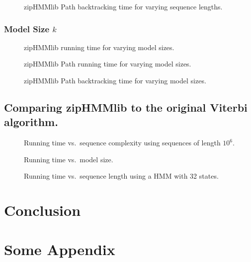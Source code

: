\documentclass[oneside,a4,danish,english,report]{memoir}
\begin{document}
\begin{figure}[H]
  \centering
  
  \caption{zipHMMlib Path backtracking time for varying sequence lengths.}
  \label{fig:assymptotic_viterbi_backtrack_n}
\end{figure}

\subsection{Model Size $k$}
\label{sec:model-size-k}

\begin{figure}[H]
  \centering
  
  \caption{zipHMMlib running time for varying model sizes.}
  \label{fig:assymptotic_viterbi_k}
\end{figure}

\begin{figure}[H]
  \centering
  
  \caption{zipHMMlib Path running time for varying model sizes.}
  \label{fig:assymptotic_viterbi_path_k}
\end{figure}

\begin{figure}[H]
  \centering
  
  \caption{zipHMMlib Path backtracking time for varying model sizes.}
  \label{fig:assymptotic_viterbi_backtrack_k}
\end{figure}

\section{Comparing zipHMMlib to the original Viterbi algorithm.}
\label{sec:comp-ziphmml-orig}

\begin{figure}[H]
  \centering
  
  \caption{Running time vs.\ sequence complexity using sequences of length $10^6$.}
  \label{fig:speedup_vs_complexity}
\end{figure}

\begin{figure}[H]
  \centering
  
  \caption{Running time vs.\ model size.}
  \label{fig:speedup_vs_k}
\end{figure}

\begin{figure}[H]
  \centering
  
  \caption{Running time vs.\ sequence length using a HMM with 32 states.}
  \label{fig:speedup_vs_sequence_length}
\end{figure}

\chapter{Conclusion}
\label{cha:conclusion}

\appendix{}

\chapter{Some Appendix}
\label{cha:some-appendix}

\backmatter{}


\end{document}
